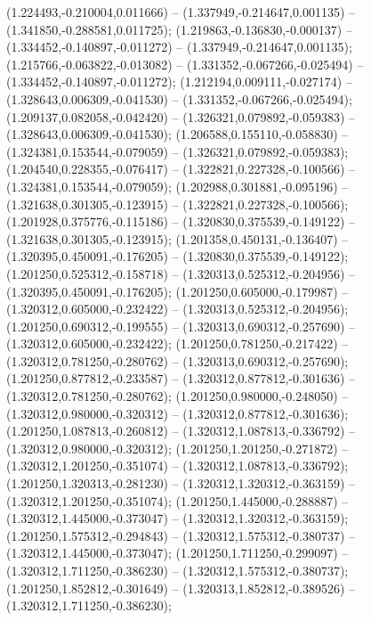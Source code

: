  (1.224493,-0.210004,0.011666) -- (1.337949,-0.214647,0.001135) -- (1.341850,-0.288581,0.011725);
 (1.219863,-0.136830,-0.000137) -- (1.334452,-0.140897,-0.011272) -- (1.337949,-0.214647,0.001135);
 (1.215766,-0.063822,-0.013082) -- (1.331352,-0.067266,-0.025494) -- (1.334452,-0.140897,-0.011272);
 (1.212194,0.009111,-0.027174) -- (1.328643,0.006309,-0.041530) -- (1.331352,-0.067266,-0.025494);
 (1.209137,0.082058,-0.042420) -- (1.326321,0.079892,-0.059383) -- (1.328643,0.006309,-0.041530);
 (1.206588,0.155110,-0.058830) -- (1.324381,0.153544,-0.079059) -- (1.326321,0.079892,-0.059383);
 (1.204540,0.228355,-0.076417) -- (1.322821,0.227328,-0.100566) -- (1.324381,0.153544,-0.079059);
 (1.202988,0.301881,-0.095196) -- (1.321638,0.301305,-0.123915) -- (1.322821,0.227328,-0.100566);
 (1.201928,0.375776,-0.115186) -- (1.320830,0.375539,-0.149122) -- (1.321638,0.301305,-0.123915);
 (1.201358,0.450131,-0.136407) -- (1.320395,0.450091,-0.176205) -- (1.320830,0.375539,-0.149122);
 (1.201250,0.525312,-0.158718) -- (1.320313,0.525312,-0.204956) -- (1.320395,0.450091,-0.176205);
 (1.201250,0.605000,-0.179987) -- (1.320312,0.605000,-0.232422) -- (1.320313,0.525312,-0.204956);
 (1.201250,0.690312,-0.199555) -- (1.320313,0.690312,-0.257690) -- (1.320312,0.605000,-0.232422);
 (1.201250,0.781250,-0.217422) -- (1.320312,0.781250,-0.280762) -- (1.320313,0.690312,-0.257690);
 (1.201250,0.877812,-0.233587) -- (1.320312,0.877812,-0.301636) -- (1.320312,0.781250,-0.280762);
 (1.201250,0.980000,-0.248050) -- (1.320312,0.980000,-0.320312) -- (1.320312,0.877812,-0.301636);
 (1.201250,1.087813,-0.260812) -- (1.320312,1.087813,-0.336792) -- (1.320312,0.980000,-0.320312);
 (1.201250,1.201250,-0.271872) -- (1.320312,1.201250,-0.351074) -- (1.320312,1.087813,-0.336792);
 (1.201250,1.320313,-0.281230) -- (1.320312,1.320312,-0.363159) -- (1.320312,1.201250,-0.351074);
 (1.201250,1.445000,-0.288887) -- (1.320312,1.445000,-0.373047) -- (1.320312,1.320312,-0.363159);
 (1.201250,1.575312,-0.294843) -- (1.320312,1.575312,-0.380737) -- (1.320312,1.445000,-0.373047);
 (1.201250,1.711250,-0.299097) -- (1.320312,1.711250,-0.386230) -- (1.320312,1.575312,-0.380737);
 (1.201250,1.852812,-0.301649) -- (1.320313,1.852812,-0.389526) -- (1.320312,1.711250,-0.386230);

